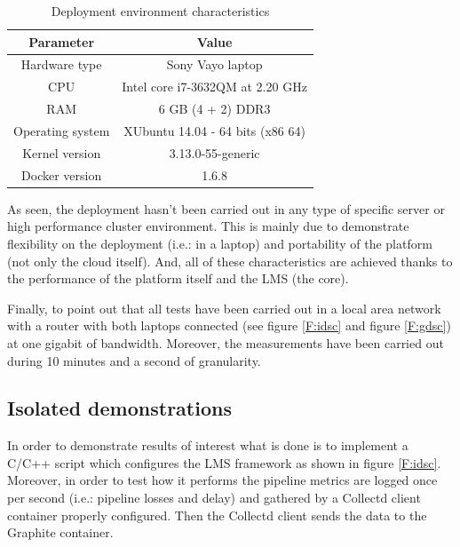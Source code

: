 \begin{table}[htb]
\caption{Deployment environment characteristics}
\begin{center}
\begin{tabular}{|c|c|}
\hline
{\bf Parameter} & {\bf Value} \\ \hline \hline
Hardware type        & Sony Vayo laptop \\ \hline
CPU        & Intel core i7-3632QM at 2.20 GHz  \\ \hline
RAM        & 6 GB (4 + 2) DDR3 \\ \hline
Operating system        & XUbuntu 14.04 - 64 bits (x86 64)  \\ \hline
Kernel version        & 3.13.0-55-generic  \\ \hline
Docker version        & 1.6.8  \\ \hline
\end{tabular}
\label{T:dec}
\end{center}
\end{table}

As seen, the deployment hasn't been carried out in any type of specific server or high performance cluster environment. This is mainly due to demonstrate flexibility on the deployment (i.e.: in a laptop) and portability of the platform (not only the cloud itself). And, all of these characteristics are achieved thanks to the performance of the platform itself and the LMS (the core).

Finally, to point out that all tests have been carried out in a local area network with a router with both laptops connected (see figure \ref{F:idsc} and figure \ref{F:gdsc}) at one gigabit of bandwidth. Moreover, the measurements have been carried out during 10 minutes and a second of granularity.

\subsection{Isolated demonstrations}

In order to demonstrate results of interest what is done is to implement a C/C++ script which configures the LMS framework as shown in figure \ref{F:idsc}. Moreover, in order to test how it performs the pipeline metrics are logged once per second (i.e.: pipeline losses and delay) and gathered by a Collectd client container properly configured. Then the Collectd client sends the data to the Graphite container. 

